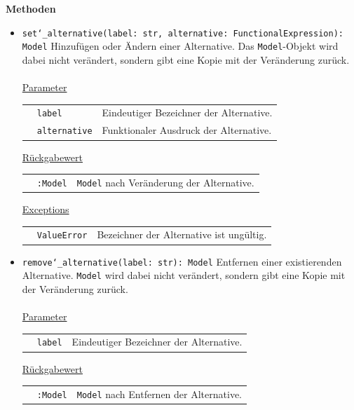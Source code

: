 \documentclass{article}
\begin{document}
\textbf{{Methoden}}
\begin{itemize}
\item \texttt{set\char`_alternative(label: str, alternative: FunctionalExpression): Model} \newline Hinzufügen oder Ändern einer Alternative. Das \texttt{Model}-Objekt wird dabei nicht verändert, sondern gibt eine Kopie mit der Veränderung zurück.
\\\\
\underline{{Parameter}}

\begin{tabular}{lll}
 & \texttt{label} & Eindeutiger Bezeichner der Alternative. \\
 & \texttt{alternative} & Funktionaler Ausdruck der Alternative. \\
\end{tabular}

\underline{{Rückgabewert}}

\begin{tabular}{lll}
 & \texttt{:Model} & \texttt{Model} nach Veränderung der Alternative. \\
\end{tabular}

\underline{Exceptions}\\
\begin{tabular}{lll}
 & \texttt{ValueError} & Bezeichner der Alternative ist ungültig.\\
\end{tabular}


\item \texttt{remove\char`_alternative(label: str): Model} \newline Entfernen einer existierenden Alternative. \texttt{Model} wird dabei nicht verändert, sondern gibt eine Kopie mit der Veränderung zurück.
\\\\
\underline{{Parameter}}

\begin{tabular}{lll}
 & \texttt{label} & Eindeutiger Bezeichner der Alternative. \\
\end{tabular}

\underline{{Rückgabewert}}

\begin{tabular}{lll}
 & \texttt{:Model} & \texttt{Model} nach Entfernen der Alternative. \\
\end{tabular}


\end{itemize}
\end{document}

